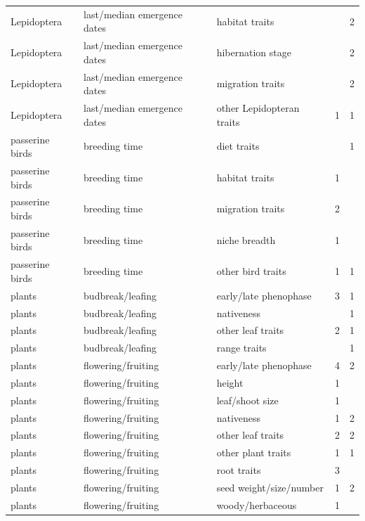 \documentclass[11pt,letter]{article}
\begin{document}
\begin{table}[ht]
\begin{tabular}{lllrr}
  Lepidoptera & last/median emergence dates & habitat traits &  &   2 \\ 
  Lepidoptera & last/median emergence dates & hibernation stage &  &   2 \\ 
  Lepidoptera & last/median emergence dates & migration traits &  &   2 \\ 
  Lepidoptera & last/median emergence dates & other Lepidopteran traits &   1 &   1 \\ 
  passerine birds & breeding time & diet traits &  &   1 \\ 
  passerine birds & breeding time & habitat traits &   1 &  \\ 
  passerine birds & breeding time & migration traits &   2 &  \\ 
  passerine birds & breeding time & niche breadth &   1 &  \\ 
  passerine birds & breeding time & other bird traits &   1 &   1 \\ 
  plants & budbreak/leafing & early/late phenophase &   3 &   1 \\ 
  plants & budbreak/leafing & nativeness &  &   1 \\ 
  plants & budbreak/leafing & other leaf traits &   2 &   1 \\ 
  plants & budbreak/leafing & range traits &  &   1 \\ 
  plants & flowering/fruiting & early/late phenophase &   4 &   2 \\ 
  plants & flowering/fruiting & height &   1 &  \\ 
  plants & flowering/fruiting & leaf/shoot size &   1 &  \\ 
  plants & flowering/fruiting & nativeness &   1 &   2 \\ 
  plants & flowering/fruiting & other leaf traits &   2 &   2 \\ 
  plants & flowering/fruiting & other plant traits &   1 &   1 \\ 
  plants & flowering/fruiting & root traits &   3 &  \\ 
  plants & flowering/fruiting & seed weight/size/number &   1 &   2 \\ 
  plants & flowering/fruiting & woody/herbaceous &   1 &  \\ 
   \hline
\end{tabular}
\endgroup
\end{table}
\end{document}

